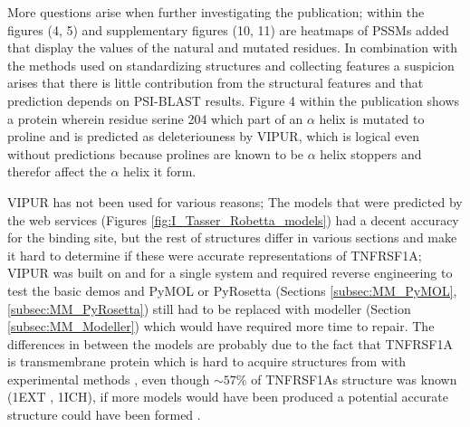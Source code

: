 More questions arise when further investigating the publication; within the figures (4, 5) \cite{baugh_robust_2016} and supplementary figures (10, 11) \cite{baugh_supplementary:_2016} are heatmaps of PSSMs added that display the values of the natural and mutated residues. In combination with the methods used on standardizing structures and collecting features a suspicion arises that there is little contribution from the structural features and that prediction depends on PSI-BLAST results. Figure 4 within the publication shows a protein wherein residue serine 204 which part of an $\alpha$ helix is mutated to proline and is predicted as deleteriouness by VIPUR, which is logical even without predictions because prolines are known to be $\alpha$ helix stoppers \cite{li_alpha-helical_1996} and therefor affect the $\alpha$ helix it form.

VIPUR has not been used for various reasons; The models that were predicted by the web services (Figures \ref{fig:I_Tasser_Robetta_models}) had a decent accuracy for the binding site, but the rest of structures differ in various sections and make it hard to determine if these were accurate representations of TNFRSF1A; VIPUR was built on and for a single system and required reverse engineering to test the basic demos and PyMOL or PyRosetta (Sections \ref{subsec:MM_PyMOL}, \ref{subsec:MM_PyRosetta}) still had to be replaced with modeller (Section \ref{subsec:MM_Modeller}) which would have required more time to repair. 
The differences in between the models are probably due to the fact that TNFRSF1A is transmembrane protein which is hard to acquire structures from with experimental methods \cite{yonath_x-ray_2011}, even though $\sim57\%$ of TNFRSF1As structure was known (1EXT\cite{naismith_structures_1996} , 1ICH\cite{sukits_solution_2001}), if more models would have been produced a potential accurate structure could have been formed .

